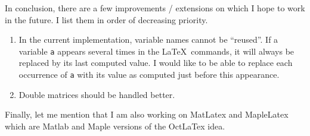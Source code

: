 \documentclass{article}
\begin{document}
 In conclusion, there are a few improvements / extensions on which I hope to work in the future. I list them 
 in order of decreasing priority. 
 \begin{enumerate}
 \item In the current implementation, variable names cannot be ``reused''. If a variable \texttt{a} appears several times
 in the \LaTeX\ commands, it will always be replaced by its last computed value. I would like to be able
 to replace each occurrence of \texttt{a} with its value as computed just before this appearance.
 \item Double matrices should be handled better.
 \end{enumerate}
 \noindent Finally, let me mention that I am also working on \textsf{MatLatex} and \textsf{MapleLatex} which are 
 \textsf{Matlab} and \textsf{Maple} versions of the \textsf{OctLaTex} idea.

 
\end{document}
